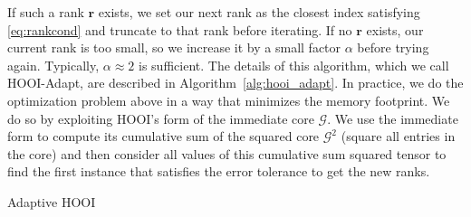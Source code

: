     If such a rank $\mathbf{r}$ exists, we set our next rank as the closest
    index satisfying \eqref{eq:rankcond} and truncate to that rank before
    iterating. If no $\mathbf{r}$ exists, our current rank is too small, so we
    increase it by a small factor $\alpha$ before trying again. Typically,
    $\alpha \approx 2$ is sufficient. The details of this algorithm, which we
    call HOOI-Adapt, are described in Algorithm~\ref{alg:hooi_adapt}. In
    practice, we do the optimization problem above in a way that minimizes the
    memory footprint. We do so by exploiting HOOI's form of the immediate core
    $\mathcal{G}$. We use the immediate form to compute its cumulative sum of
    the squared core $\mathcal{G}^2$ (square all entries in the core) and then
    consider all values of this cumulative sum squared tensor to find the first
    instance that satisfies the error tolerance to get the new ranks.

    \begin{algorithm}
        \caption{Adaptive HOOI}
        \label{alg:Adaptive-HOOI}
        \begin{algorithmic}
                    \State{}
                \Else{}
                \EndIf{}
            \EndFunction{}
        \end{algorithmic}
    \end{algorithm}

    
